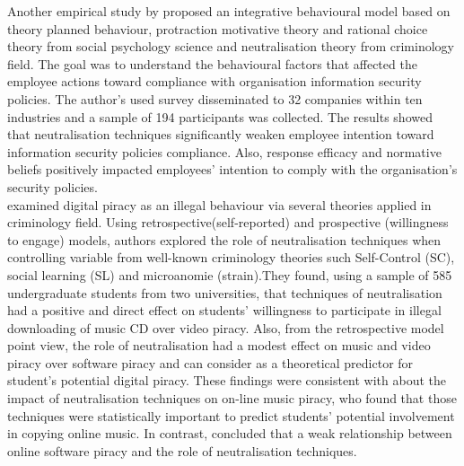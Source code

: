 Another empirical study by\citet{Kim2014} proposed an integrative behavioural model based on theory planned behaviour, protraction motivative theory and rational choice theory from social psychology science and neutralisation theory from criminology field. The goal was to understand the behavioural factors that affected the employee actions toward compliance with organisation information security policies. The author's used survey disseminated to 32 companies within ten industries and a sample of 194 participants was collected. The results showed that neutralisation techniques significantly weaken employee intention toward information security policies compliance. Also, response efficacy and normative beliefs positively impacted employees’ intention to comply with the organisation’s security policies.\\

\citet{Morris} examined digital piracy as an illegal behaviour via several theories applied in criminology field. Using retrospective(self-reported) and prospective (willingness to engage) models, authors explored the role of neutralisation techniques when controlling variable from well-known criminology theories such Self-Control (SC), social learning (SL) and microanomie (strain).They found, using a sample of 585 undergraduate students from two universities, that techniques of neutralisation had a positive and direct effect on students' willingness to participate in illegal downloading of music CD over video piracy. Also, from the retrospective model point view, the role of neutralisation had a modest effect on music and video piracy over software piracy and can consider as a theoretical predictor for student’s potential digital piracy. These findings were consistent with \cite{Ingram2008} about the impact of neutralisation techniques on on-line music piracy, who found that those techniques were statistically important to predict students’ potential involvement in copying online music. In contrast, \cite{Hinduja2007} concluded that a weak relationship between online software piracy and the role of neutralisation techniques.
    
